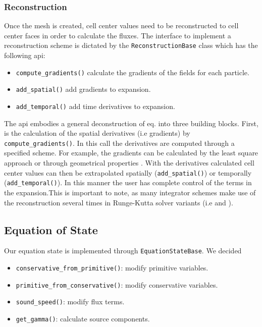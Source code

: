 \subsubsection{Reconstruction}
Once the mesh is created, cell center values need to be reconstructed to cell center faces
in order to calculate the fluxes. The interface to implement a reconstruction
scheme is dictated by the \lstinline{ReconstructionBase} class which has the following api:
\begin{itemize}
	\item \lstinline{compute_gradients()} calculate the gradients of the fields for each particle.
    \item \lstinline{add_spatial()} add gradients to expansion.
    \item \lstinline{add_temporal()} add time derivatives to expansion.
\end{itemize}
The api embodies a general deconstruction of eq. into three building blocks. First, is the
calculation of the spatial derivatives (i.e gradients) by \lstinline{compute_gradients()}.
In this call the derivatives are computed through a specified scheme. For example, the gradients can be 
calculated by the least square approach \citep{Pakmor2016} or through geometrical properties 
\citep{Springel2010}. With the derivatives calculated cell center values can then be extrapolated spatially
(\lstinline{add_spatial()}) or temporally (\lstinline{add_temporal()}). In this manner the
user has complete control of the terms in the expansion.This is important to note, as many integrator 
schemes make use of the reconstruction several times in Runge-Kutta solver variants (i.e \cite{Pakmor2016} 
and \cite{Duffell2011}).

\subsection{Equation of State}
Our equation state is implemented through \lstinline{EquationStateBase}. We
decided 
\begin{itemize}
    \item \lstinline{conservative_from_primitive()}: modify primitive variables.
    \item \lstinline{primitive_from_conservative()}: modify conservative variables.
    \item \lstinline{sound_speed()}: modify flux terms.
    \item \lstinline{get_gamma()}: calculate source components.
\end{itemize}


